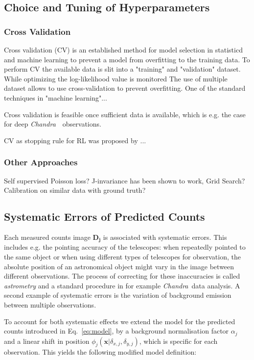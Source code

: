 \documentclass[twocolumn]{aastex631}
\newcommand{\chandra}{\textit{Chandra}~}
\begin{document}
    \subsection{Choice and Tuning of Hyperparameters}
    \subsubsection{Cross Validation}
    Cross validation (CV) is an established method for model selection in statisticd and machine learning to prevent a model from overfitting to the training data. To perform CV the available data is slit into a "training" and "validation" dataset. While optimizing the log-likelihood value is monitored  The use of multiple dataset allows to use cross-validation to prevent overfitting. One of the standard techniques in "machine learning"...

    Cross validation is feasible once sufficient data is available, which is e.g. the 
    case for deep \chandra~observations.

    CV as stopping rule for RL was proposed by \cite{Reeves1995}...

    \subsubsection{Other Approaches}

    Self supervised Poisson loss? J-invariance has been shown to work, Grid Search? Calibration on similar data with ground truth?
    

    \subsection{Systematic Errors of Predicted Counts}
    Each measured counts image $\mathbf{D_j}$ is associated with systematic errors.
    This includes e.g. the pointing accuracy of the telescopes: when repeatedly pointed
    to the same object or when using different types of telescopes for observation, the
    absolute position of an astronomical object might vary in the image between different
    observations. The process of correcting for these inaccuracies is called \textit{astrometry} and a standard procedure in for example \chandra data analysis.
    A second example of systematic errors is the variation of background emission
    between multiple observations.
    
    To account for both systematic effects we extend the model for the predicted
    counts introduced in Eq.~\ref{eq:model}, by a background normalisation factor
    $\alpha_j$ and a linear shift in position $\phi_j(\mathbf{x}| \delta_{x,j}, \delta_{y,j})$, which is specific for each observation. This yields the following modified model definition:
    
\end{document}
